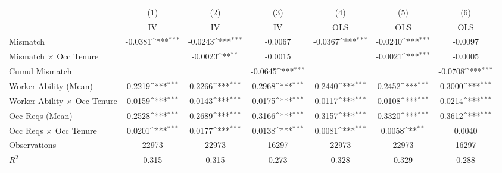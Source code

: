 {
\def\sym#1{\ifmmode^{#1}\else\(^{#1}\)\fi}
\begin{tabular}{l*{6}{c}}
\hline  
                    &\multicolumn{1}{c}{(1)}&\multicolumn{1}{c}{(2)}&\multicolumn{1}{c}{(3)}&\multicolumn{1}{c}{(4)}&\multicolumn{1}{c}{(5)}&\multicolumn{1}{c}{(6)}\\
                    &\multicolumn{1}{c}{IV}&\multicolumn{1}{c}{IV}&\multicolumn{1}{c}{IV}&\multicolumn{1}{c}{OLS}&\multicolumn{1}{c}{OLS}&\multicolumn{1}{c}{OLS}\\
\hline  
Mismatch            &     -0.0381\sym{***}&     -0.0243\sym{***}&     -0.0067         &     -0.0367\sym{***}&     -0.0240\sym{***}&     -0.0097         \\
[1em]
Mismatch $\times$ Occ Tenure&                     &     -0.0023\sym{**} &     -0.0015         &                     &     -0.0021\sym{***}&     -0.0005         \\
[1em]
Cumul Mismatch      &                     &                     &     -0.0645\sym{***}&                     &                     &     -0.0708\sym{***}\\
[1em]
Worker Ability (Mean)&      0.2219\sym{***}&      0.2266\sym{***}&      0.2968\sym{***}&      0.2440\sym{***}&      0.2452\sym{***}&      0.3000\sym{***}\\
[1em]
Worker Ability $\times$ Occ Tenure&      0.0159\sym{***}&      0.0143\sym{***}&      0.0175\sym{***}&      0.0117\sym{***}&      0.0108\sym{***}&      0.0214\sym{***}\\
[1em]
Occ Reqs (Mean)     &      0.2528\sym{***}&      0.2689\sym{***}&      0.3166\sym{***}&      0.3157\sym{***}&      0.3320\sym{***}&      0.3612\sym{***}\\
[1em]
Occ Reqs $\times$ Occ Tenure&      0.0201\sym{***}&      0.0177\sym{***}&      0.0138\sym{***}&      0.0081\sym{***}&      0.0058\sym{**} &      0.0040         \\
\hline  
Observations        &       22973         &       22973         &       16297         &       22973         &       22973         &       16297         \\
\(R^{2}\)           &       0.315         &       0.315         &       0.273         &       0.328         &       0.329         &       0.288         \\
\hline  
\end{tabular}
}
